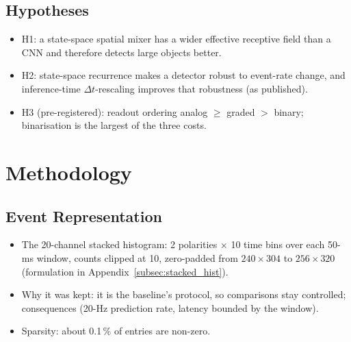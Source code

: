 \documentclass[11pt, a4paper]{report}
\newcommand{\Dt}{$\Delta t$}
\begin{document}
\section{Hypotheses}
\begin{itemize}
  \item H1: a state-space spatial mixer has a wider effective receptive field than a CNN and therefore detects large objects better.
  \item H2: state-space recurrence makes a detector robust to event-rate change, and inference-time \Dt{}-rescaling improves that robustness (as published).
  \item H3 (pre-registered): readout ordering analog $\geq$ graded $>$ binary; binarisation is the largest of the three costs.
\end{itemize}

\chapter{Methodology}
\label{ch:method}
\section{Event Representation}
\begin{itemize}
  \item The 20-channel stacked histogram: 2 polarities $\times$ 10 time bins over each 50-ms window, counts clipped at 10, zero-padded from $240\times304$ to $256\times320$ (formulation in Appendix~\ref{subsec:stacked_hist}).
  \item Why it was kept: it is the baseline's protocol, so comparisons stay controlled; consequences (20-Hz prediction rate, latency bounded by the window).
  \item Sparsity: about 0.1\,\% of entries are non-zero.
\end{itemize}
\end{document}
